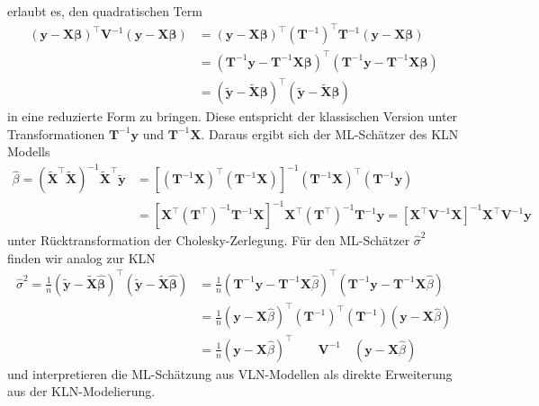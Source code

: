 erlaubt es, den quadratischen Term
\begin{align*}
    \left( \mathbf{y-X\beta} \right)^{\top} \mathbf{V}^{-1} \left( \mathbf{y-X\beta} \right) 
    &= \left( \mathbf{y-X\beta} \right)^{\top} (\mathbf{T}^{-1})^{\top} \mathbf{T}^{-1} \left( \mathbf{y-X\beta} \right) \\ 
    &= \left( \mathbf{T}^{-1} \mathbf{y}- \mathbf{T}^{-1} \mathbf{X\beta} \right)^{\top} \left( \mathbf{T}^{-1} \mathbf{y}- \mathbf{T}^{-1} \mathbf{X\beta} \right) \\
    &= \left( \mathbf{\tilde{y}-\tilde{X} \beta} \right)^{\top} \left( \mathbf{\tilde{y}-\tilde{X} \beta} \right)
\end{align*}
in eine reduzierte Form zu bringen. Diese entspricht der klassischen Version unter Transformationen 
$\mathbf{T}^{-1} \mathbf{y}$ und $\mathbf{T}^{-1} \mathbf{X}$. 
Daraus ergibt sich der ML-Schätzer des KLN Modells
\begin{align*}
    \hat{\beta}=\left( \mathbf{\tilde{X}}^{\top} \mathbf{\tilde{X}} \right)^{-1} \mathbf{\tilde{X}}^{\top} \mathbf{\tilde{y}} 
    &=\left[ \left( \mathbf{T}^{-1} \mathbf{X} \right)^{\top} \left( \mathbf{T}^{-1} \mathbf{X} \right) \right]^{-1}
    \left( \mathbf{T}^{-1} \mathbf{X} \right)^{\top} \left( \mathbf{T}^{-1} \mathbf{y} \right)\\
    &=\left[ \mathbf{X}^{\top} \left(\mathbf{T}^{\top} \right)^{-1} \mathbf{T}^{-1} \mathbf{X} \right]^{-1}
    \mathbf{X}^{\top} \left(\mathbf{T}^{\top} \right)^{-1} \mathbf{T}^{-1} \mathbf{y}
    =\left[ \mathbf{X}^{\top} \mathbf{V}^{-1} \mathbf{X} \right]^{-1}
    \mathbf{X}^{\top} \mathbf{V}^{-1} \mathbf{y}
\end{align*}
unter Rücktransformation der Cholesky-Zerlegung. 
Für den ML-Schätzer $\hat{\sigma}^2$ finden wir analog zur KLN  
\begin{align*}
    \hat{\sigma}^{2} = \frac{1}{n} \left( \mathbf{\tilde{y}-\tilde{X} \hat{\beta}} \right)^{\top} \left( \mathbf{\tilde{y}-\tilde{X} \hat{\beta}} \right) 
    &= \frac{1}{n} \left( \mathbf{T}^{-1} \mathbf{y} - \mathbf{T}^{-1} \mathbf{X} \hat{\beta} \right)^{\top} \left( \mathbf{T}^{-1} \mathbf{y}- \mathbf{T}^{-1} \mathbf{X} \hat{\beta} \right)\\
    &= \frac{1}{n} \left( \mathbf{y} - \mathbf{X} \hat{\beta} \right)^{\top} \left( \mathbf{T}^{-1} \right)^{\top} \left( \mathbf{T}^{-1} \right) \left( \mathbf{y}- \mathbf{X} \hat{\beta} \right)\\
    &= \frac{1}{n} \left( \mathbf{y} - \mathbf{X} \hat{\beta} \right)^{\top} \qquad \mathbf{V}^{-1} \quad \left( \mathbf{y}- \mathbf{X} \hat{\beta} \right)
\end{align*}
und interpretieren die ML-Schätzung aus VLN-Modellen als direkte Erweiterung aus der KLN-Modelierung. 

